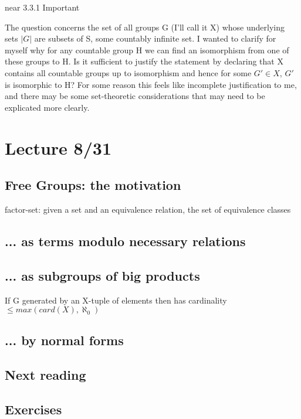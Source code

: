 \documentclass[12pt]{article}
\begin{document}
near 3.3.1
Important

The question concerns the set of all groups G (I'll call it X) whose underlying sets $|G|$ are subsets of S, some countably infinite set.  I wanted to clarify for myself why for any countable group H we can find an isomorphism from one of these groups to H.  Is it sufficient to justify the statement by declaring that X contains all countable groups up to isomorphism and hence for some $G' \in X$, $G'$ is isomorphic to H?  For some reason this feels like incomplete justification to me, and there may be some set-theoretic considerations that may need to be explicated more clearly.

\section{Lecture 8/31}

\subsection{Free Groups: the motivation}

\noindent
factor-set: given a set and an equivalence relation, the set of equivalence classes

\subsection{... as terms modulo necessary relations}


\subsection{... as subgroups of big products}

\noindent
If G generated by an X-tuple of elements then has cardinality $\leq max(card(X), \aleph_0)$

\subsection{... by normal forms}


\subsection{Next reading}



\subsection{Exercises}
\end{document}
